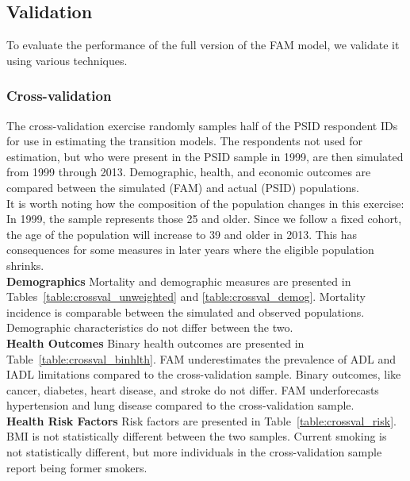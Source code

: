 \subsection{Validation}
\label{appendix:health-validation}
\noindent To evaluate the performance of the full version of the FAM model, we validate it using various techniques. \\

\subsubsection{Cross-validation}
\noindent The cross-validation exercise randomly samples half of the PSID respondent IDs for use in estimating the transition models. The respondents not used for estimation, but who were present in the PSID sample in 1999, are then simulated from 1999 through 2013. Demographic, health, and economic outcomes are compared between the simulated (FAM) and actual (PSID) populations. \\

\noindent It is worth noting how the composition of the population changes in this exercise: In 1999, the sample represents those 25 and older. Since we follow a fixed cohort, the age of the population will increase to 39 and older in 2013. This has consequences for some measures in later years where the eligible population shrinks.\\

\noindent\textbf{Demographics}
Mortality and demographic measures are presented in Tables~\ref{table:crossval_unweighted} and \ref{table:crossval_demog}. Mortality incidence is comparable between the simulated and observed populations. Demographic characteristics do not differ between the two.\\

\noindent\textbf{Health Outcomes}
Binary health outcomes are presented in Table~\ref{table:crossval_binhlth}. FAM underestimates the prevalence of ADL and IADL limitations compared to the cross-validation sample. Binary outcomes, like cancer, diabetes, heart disease, and stroke do not differ. FAM underforecasts hypertension and lung disease compared to the cross-validation sample.\\

\noindent\textbf{Health Risk Factors}
Risk factors are presented in Table~\ref{table:crossval_risk}. BMI is not statistically different between the two samples. Current smoking is not statistically different, but more individuals in the cross-validation sample report being former smokers.\\

